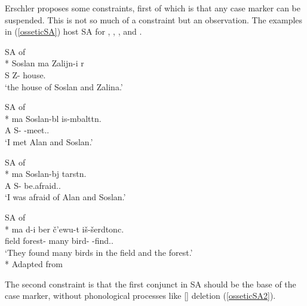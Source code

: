 Erschler proposes some constraints, first of which is that any case marker can be suspended. This is not so much of a constraint but an observation. The examples in (\ref{osseticSA}) host SA for {\Obl}, {\Sup}, {\Abl}, and {\Loc}.

\begin{exe}
    \ex \label{osseticSA}
    \begin{xlist}
        \ex SA of {\Obl}\\* 
        \gll Soslan {\textturna ma} {Zalijn-i} {\textchi\textturna\textdzlig r\textturna} \\ 
        S {\And} Z-{\Obl} house. \\
        \glt `the house of Soslan and Zalina.'
        
        \ex SA of {\Sup}\\*
         {\textturna ma} {Soslan-b\textturna l} {is-\textturna mbaltt\textturna n}. \\ 
        A {\And} S-{\Sup} {\Prv}-meet.{\Pst}.{\Fsg} \\
        \glt `I met Alan and Soslan.'
        
        \ex SA of {\Abl}\\*
         {\textturna ma} {Soslan-b\textturna j} {tarst\textturna n}. \\ 
        A {\And} S-{\Abl} be.afraid.{\Pst}.{\Fsg} \\
        \glt `I was afraid of Alan and Soslan.'
        
        \ex SA of {\Loc}\\*
         {\textturna ma} {\textinvscr\textturna d-i} {ber\textturna} {\v{c}'ewu-t\textturna} {i\v{s}-\v{s}erdtonc\textturna}. \\ 
        field {\And} forest-{\Loc} many bird-{\Pl} {\Prv}-find.{\Pst}.{\Tpl} \\
        \glt `They found many birds in the field and the forest.'\\*
        \hfill Adapted from \citet{erschler2012suspended}
    \end{xlist}
\end{exe}

The second constraint is that the first conjunct in SA should be the base of the case marker, without phonological processes like [\textturna] deletion (\ref{osseticSA2}).

